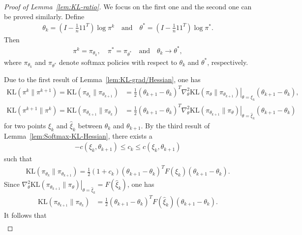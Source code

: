 \begin{proof}[Proof of Lemma~\ref{lem:KL-ratio}]
    We focus on the first one and the second one can be proved similarly. Define
    \begin{align*}
        \theta_k = \left(I-\frac{1}{n}11^T\right)\log \pi^k\quad\mathrm{and}\quad\theta^*=\left(I-\frac{1}{n}11^T\right)\log \pi^*.
    \end{align*}    
    Then
    \begin{align*}
        \pi^k=\pi_{\theta_k}, \quad  \pi^*=\pi_{\theta^*} \quad \mathrm{and}\quad \theta_k \to \theta^* ,
    \end{align*}    
    where $\pi_{\theta_k}$ and $\pi_{\theta^*}$ denote softmax policies with respect to $\theta_k$ and $\theta^*$, respectively.

    Due to the first result of Lemma~\ref{lem:KL-grad/Hessian}, one has
    \begin{align*}
        \mathrm{KL}(\pi^k\|\pi^{k+1})=\mathrm{KL}(\pi_{\theta_k}\|\pi_{\theta_{k+1}}) &= \frac{1}{2}(\theta_{k+1}-\theta_k)^T\left.\nabla_\theta^2\mathrm{KL}(\pi_\theta\|\pi_{\theta_{k+1}})\right|_{\theta=\xi_k}(\theta_{k+1}-\theta_k),\\
        \mathrm{KL}(\pi^{k+1}\|\pi^{k}) =\mathrm{KL}(\pi_{\theta_{k+1}}\|\pi_{\theta_{k}}) &=\frac{1}{2}(\theta_{k+1}-\theta_k)^T\left.\nabla_\theta^2\mathrm{KL}(\pi_{\theta_{k+1}}\|\pi_\theta)\right|_{\theta=\hat{\xi}_k}(\theta_{k+1}-\theta_k)
    \end{align*}    
    for two points $\xi_k$ and $\hat{\xi}_k$ between $\theta_k$ and $\theta_{k+1}$. By the third result of Lemma~\ref{lem:Softmax-KL-Hessian}, there exists a
    \begin{align*}
        -c(\xi_k,\theta_{k+1})\leq c_k\leq c(\xi_k,\theta_{k+1})
    \end{align*}
    such that 
    \begin{align*}
        \mathrm{KL}(\pi_{\theta_k}\|\pi_{\theta_{k+1}}) = \frac{1}{2}(1+c_k)(\theta_{k+1}-\theta_k)^TF(\xi_k)(\theta_{k+1}-\theta_k).
    \end{align*}    
    Since $\left.\nabla_\theta^2\mathrm{KL}(\pi_{\theta_{k+1}}\|\pi_\theta)\right|_{\theta=\hat{\xi}_k}=F(\hat{\xi}_k)$, one has
    \begin{align*}
        \mathrm{KL}(\pi_{\theta_{k+1}}\|\pi_{\theta_{k}}) &=\frac{1}{2}(\theta_{k+1}-\theta_k)^TF(\hat{\xi}_k)(\theta_{k+1}-\theta_k).
    \end{align*}    
    It follows that
    \begin{align*}

\end{align*}
\end{proof}
